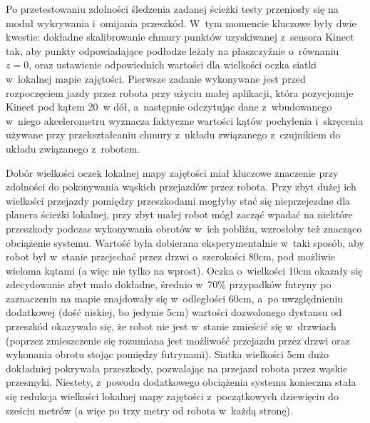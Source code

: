 Po przetestowaniu zdolności śledzenia zadanej ścieżki testy przeniosły się
na moduł wykrywania i~omijania przeszkód. W~tym momencie kluczowe były dwie
kwestie: dokładne skalibrowanie chmury punktów uzyskiwanej z~sensora Kinect
tak, aby punkty odpowiadające podłodze leżały na płaszczyźnie o~równaniu
$z=0$, oraz ustawienie odpowiednich wartości dla wielkości oczka siatki
w~lokalnej mapie zajętości. Pierwsze zadanie wykonywane jest przed rozpoczęciem
jazdy przez robota przy użyciu małej aplikacji, która pozycjonuje Kinect
pod kątem 20\textdegree ~w dół, a~następnie odczytując dane z~wbudowanego
w~niego akcelerometru wyznacza faktyczne wartości kątów pochylenia i~skręcenia
używane przy przekształcaniu chmury z~układu związanego z~czujnikiem do układu
związanego z~robotem.

Dobór wielkości oczek lokalnej mapy zajętości miał kluczowe znaczenie przy zdolności
do pokonywania wąskich przejazdów przez robota. Przy zbyt dużej ich wielkości
przejazdy pomiędzy przeszkodami mogłyby stać się nieprzejezdne dla planera
ścieżki lokalnej, przy zbyt małej robot mógł zacząć wpadać na niektóre przeszkody
podczas wykonywania obrotów w~ich pobliżu, wzrosłoby też znacząco obciążenie
systemu. Wartość była dobierana eksperymentalnie w~taki sposób, aby robot był
w~stanie przejechać przez drzwi o~szerokości 80cm, pod możliwie wieloma kątami
(a więc nie tylko na wprost). Oczka o~wielkości 10cm okazały się zdecydowanie
zbyt mało dokładne, średnio w~70\% przypadków futryny po zaznaczeniu na mapie
znajdowały się w~odległości 60cm, a~po uwzględnieniu dodatkowej (dość niskiej,
bo jedynie 5cm) wartości dozwolonego dystansu od przeszkód okazywało się, że
robot nie jest w~stanie zmieścić się w~drzwiach (poprzez zmieszczenie się
rozumiana jest możliwość przejazdu przez drzwi oraz wykonania obrotu stojąc
pomiędzy futrynami). Siatka wielkości 5cm dużo dokładniej pokrywała przeszkody,
pozwalając na przejazd robota przez wąskie przesmyki. Niestety, z~powodu dodatkowego
obciążenia systemu konieczna stała się redukcja wielkości lokalnej mapy zajętości
z~początkowych dziewięciu do sześciu metrów (a więc po trzy metry od robota
w~każdą stronę).

